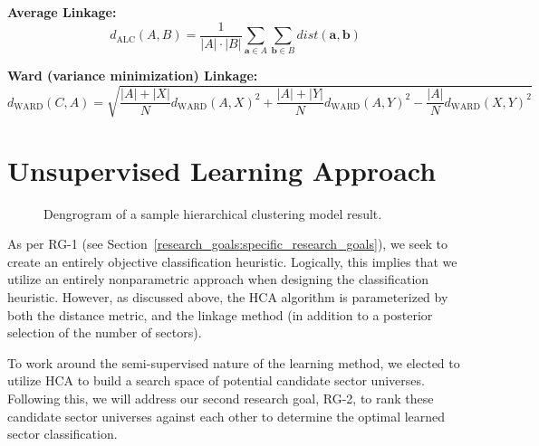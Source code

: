 \documentclass[../main.tex]{subfiles}
\begin{document}
\hspace{7em} \textbf{Average Linkage:}
        $$ d_\text{ALC}(A, B) = \frac{1}{|A| \cdot |B|} \sum_{\boldsymbol{a} \in A} \sum_{\boldsymbol{b} \in B} dist(\boldsymbol{a}, \boldsymbol{b}) $$
    
\hspace{7em} \textbf{Ward (variance minimization) Linkage:}
        $$ d_\text{WARD}(C, A) = \sqrt{ \frac{|A| + |X|}{N} d_\text{WARD}(A, X)^2 + \frac{|A| + |Y|}{N} d_\text{WARD}(A, Y)^2 - \frac{|A|}{N} d_\text{WARD}(X, Y)^2 } $$

\section{Unsupervised Learning Approach}

\begin{figure}
    \centering
    \vspace{\wrapfigadjustment}
    \caption{Dengrogram of a sample hierarchical clustering model result.}
    \label{fig:hierarchical_clustering_model:sample_dendogram}
\end{figure}

As per RG-1 (see Section~\ref{research_goals:specific_research_goals}), we seek to create an entirely objective classification heuristic. Logically, this implies that we utilize an entirely nonparametric approach when designing the classification heuristic. However, as discussed above, the HCA algorithm is parameterized by both the distance metric, and the linkage method (in addition to a posterior selection of the number of sectors).

To work around the semi-supervised nature of the learning method, we elected to utilize HCA to build a search space of potential candidate sector universes. Following this, we will address our second research goal, RG-2, to rank these candidate sector universes against each other to determine the optimal learned sector classification.
\end{document}
